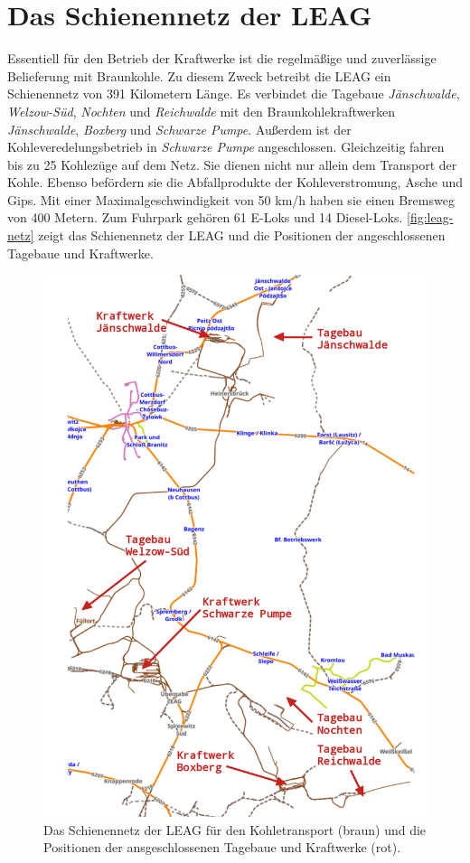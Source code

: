 \section{Das Schienennetz der LEAG}

Essentiell für den Betrieb der Kraftwerke ist die regelmäßige und zuverlässige Belieferung mit Braunkohle. Zu diesem Zweck betreibt die LEAG  ein Schienennetz von 391 Kilometern Länge\cite{hertzer_eisenbahner_2018}. Es verbindet die Tagebaue \emph{Jänschwalde}, \emph{Welzow-Süd}, \emph{Nochten} und \emph{Reichwalde} mit den Braunkohlekraftwerken \emph{Jänschwalde}, \emph{Boxberg} und \emph{Schwarze Pumpe}. Außerdem ist der Kohleveredelungsbetrieb in \emph{Schwarze Pumpe} angeschlossen\cite{noauthor_tagebau_2023}. Gleichzeitig fahren bis zu 25 Kohlezüge auf dem Netz. Sie dienen nicht nur allein dem Transport der Kohle. Ebenso befördern sie die Abfallprodukte der Kohleverstromung, Asche und Gips. Mit einer Maximalgeschwindigkeit von 50 km/h haben sie einen Bremsweg von 400 Metern. Zum Fuhrpark gehören 61 E-Loks und 14 Diesel-Loks\cite{hertzer_eisenbahner_2018}. \autoref{fig:leag-netz} zeigt das Schienennetz der LEAG und die Positionen der angeschlossenen Tagebaue und Kraftwerke.

\begin{figure}[!ht]
	\centering
	\includegraphics[width=0.75\linewidth]{images/LEAG-Netz-annotated.png}
	\caption{Das Schienennetz der LEAG für den Kohletransport (braun) und die Positionen der ansgeschlossenen Tagebaue und Kraftwerke (rot).}
	\label{fig:leag-netz}
\end{figure}